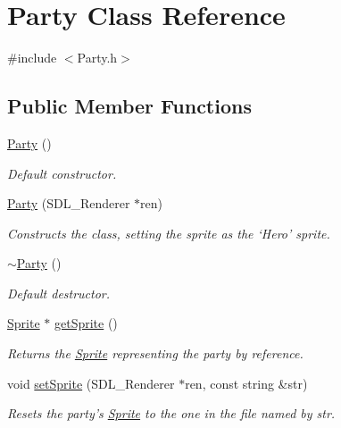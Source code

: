 \hypertarget{class_party}{}\section{Party Class Reference}
\label{class_party}


{\ttfamily \#include $<$Party.\+h$>$}

\subsection*{Public Member Functions}
\begin{DoxyCompactItemize}
\item 
\hyperlink{class_party_a31d77f763e1dc9549532653a4a0dfde5}{Party} ()\hypertarget{class_party_a31d77f763e1dc9549532653a4a0dfde5}{}\label{class_party_a31d77f763e1dc9549532653a4a0dfde5}

\begin{DoxyCompactList}\small\item\em Default constructor. \end{DoxyCompactList}\item 
\hyperlink{class_party_a950ef19c74b4ff434064d909145b4190}{Party} (S\+D\+L\+\_\+\+Renderer $\ast$ren)\hypertarget{class_party_a950ef19c74b4ff434064d909145b4190}{}\label{class_party_a950ef19c74b4ff434064d909145b4190}

\begin{DoxyCompactList}\small\item\em Constructs the class, setting the sprite as the ‘\+Hero’ sprite. \end{DoxyCompactList}\item 
\hyperlink{class_party_a85aa837e38a06690e6fee5087d7c7ad7}{$\sim$\+Party} ()\hypertarget{class_party_a85aa837e38a06690e6fee5087d7c7ad7}{}\label{class_party_a85aa837e38a06690e6fee5087d7c7ad7}

\begin{DoxyCompactList}\small\item\em Default destructor. \end{DoxyCompactList}\item 
\hyperlink{class_sprite}{Sprite} $\ast$ \hyperlink{class_party_a79d7e55a83b66a41146679deb3b4c533}{get\+Sprite} ()\hypertarget{class_party_a79d7e55a83b66a41146679deb3b4c533}{}\label{class_party_a79d7e55a83b66a41146679deb3b4c533}

\begin{DoxyCompactList}\small\item\em Returns the \hyperlink{class_sprite}{Sprite} representing the party by reference. \end{DoxyCompactList}\item 
void \hyperlink{class_party_abe069ffbbf3352f6b39246c8382dd26b}{set\+Sprite} (S\+D\+L\+\_\+\+Renderer $\ast$ren, const string \&str)\hypertarget{class_party_abe069ffbbf3352f6b39246c8382dd26b}{}\label{class_party_abe069ffbbf3352f6b39246c8382dd26b}

\begin{DoxyCompactList}\small\item\em Resets the party’s \hyperlink{class_sprite}{Sprite} to the one in the file named by str. \end{DoxyCompactList}\end{DoxyCompactItemize}
